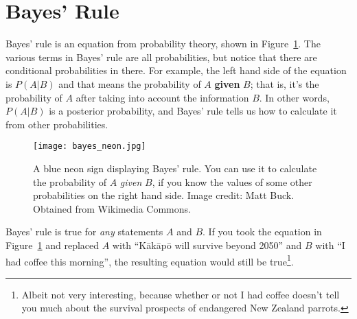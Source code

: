 \section{Bayes' Rule}
Bayes' rule is an equation from probability theory, shown in
Figure~\ref{fig:bayes_neon}. The various terms in Bayes' rule are all
probabilities, but notice that there are conditional probabilities in there.
For example, the left hand side of the equation is $P(A|B)$ and that means
the probability of $A$ {\bf given} $B$; that is, it's the probability of $A$
after taking into account the information $B$. In other words,
$P(A|B)$ is a posterior probability, and Bayes' rule tells us how to calculate
it from other probabilities.
\begin{figure}[h]
\begin{center}
\texttt{[image: bayes\_neon.jpg]}
\caption{A blue neon sign displaying Bayes' rule.
You can use it to calculate the probability of $A$ {\it given} $B$,
if you know the values of some other probabilities on the right hand side.
Image credit: Matt Buck. Obtained from Wikimedia Commons.
\label{fig:bayes_neon}}
\end{center}
\end{figure}
Bayes' rule is true for {\it any} statements $A$ and $B$. If you took the
equation in Figure~\ref{fig:bayes_neon} and replaced $A$ with
``K\={a}k\={a}p\={o} will survive beyond 2050'' and $B$ with
``I had coffee this morning'', the
resulting equation would still be true\footnote{Albeit not very interesting,
because
whether or not I had coffee doesn't tell you much about the survival prospects
of endangered New Zealand parrots.}.

